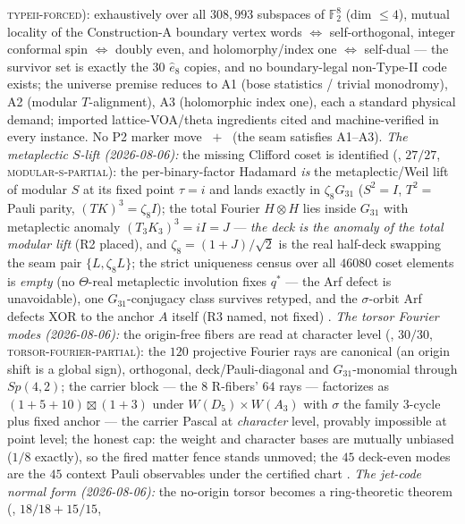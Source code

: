 \documentclass[11pt,a4paper]{article}
\theoremstyle{definition}
\begin{document}
\begin{keybox}
\textsc{typeii-forced}): exhaustively over all $308{,}993$
subspaces of $\mathbb F_2^8$ (dim $\le4$), mutual locality of the
Construction-A boundary vertex words $\iff$ self-orthogonal,
integer conformal spin $\iff$ doubly even, and holomorphy/index
one $\iff$ self-dual --- the survivor set is exactly the $30$
$\hat e_8$ copies, and no boundary-legal non-Type-II code exists;
the universe premise reduces to A1 (bose statistics / trivial
monodromy), A2 (modular $T$-alignment), A3 (holomorphic index
one), each a standard physical demand; imported lattice-VOA/theta
ingredients cited and machine-verified in every instance.  No P2
marker move \mE\ $+$ \mC\ (the seam satisfies A1--A3).
\emph{The metaplectic $S$-lift (2026-08-06):} the missing Clifford
coset is identified
(, $27/27$,
\textsc{modular-s-partial}): the per-binary-factor Hadamard
\emph{is} the metaplectic/Weil lift of modular $S$ at its fixed
point $\tau=i$ and lands exactly in $\zeta_8G_{31}$ ($S^2=I$,
$T^2=$ Pauli parity, $(TK)^3=\zeta_8I$); the total Fourier
$H\otimes H$ lies inside $G_{31}$ with metaplectic anomaly
$(T_3K_3)^3=iI=J$ --- \emph{the deck is the anomaly of the total
modular lift} (R2 placed), and $\zeta_8=(1{+}J)/\sqrt2$ is the
real half-deck swapping the seam pair $\{L,\zeta_8L\}$; the strict
uniqueness census over all $46080$ coset elements is \emph{empty}
(no $\Theta$-real metaplectic involution fixes $q^{*}$ --- the Arf
defect is unavoidable), one $G_{31}$-conjugacy class survives
retyped, and the $\sigma$-orbit Arf defects XOR to the anchor $A$
itself (R3 named, not fixed) \mE.
\emph{The torsor Fourier modes (2026-08-06):} the origin-free
fibers are read at character level
(, $30/30$,
\textsc{torsor-fourier-partial}): the $120$ projective Fourier
rays are canonical (an origin shift is a global sign), orthogonal,
deck/Pauli-diagonal and $G_{31}$-monomial through $Sp(4,2)$; the
carrier block --- the $8$ R-fibers' $64$ rays --- factorizes as
$(1{+}5{+}10)\boxtimes(1{+}3)$ under $W(D_5)\times W(A_3)$ with
$\sigma$ the family $3$-cycle plus fixed anchor --- the carrier
Pascal at \emph{character} level, provably impossible at point
level; the honest cap: the weight and character bases are mutually
unbiased ($1/8$ exactly), so the fired matter fence stands
unmoved; the $45$ deck-even modes are the $45$ context Pauli
observables under the certified chart \mE.
\emph{The jet-code normal form (2026-08-06):} the no-origin
torsor becomes a ring-theoretic theorem
(, $18/18+15/15$,

\end{keybox}
\end{document}
